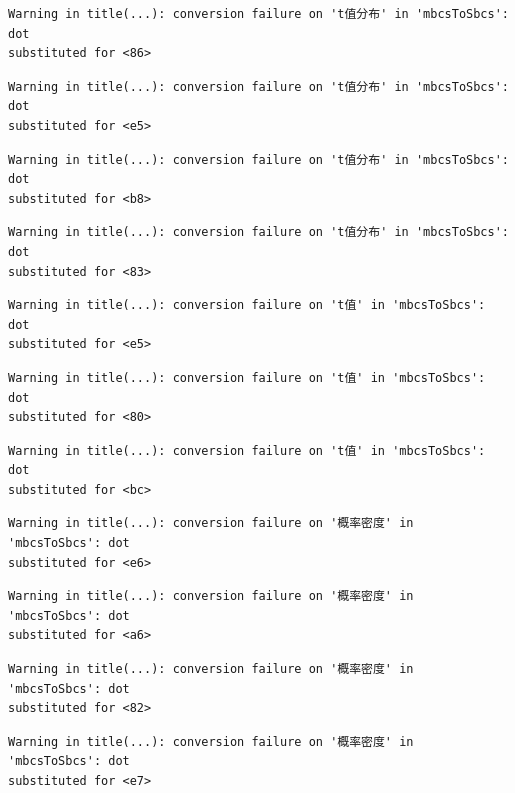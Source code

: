 \documentclass[
  letterpaper,
  DIV=11,
  numbers=noendperiod]{scrreprt}
\begin{document}
\begin{verbatim}
Warning in title(...): conversion failure on 't值分布' in 'mbcsToSbcs': dot
substituted for <86>
\end{verbatim}

\begin{verbatim}
Warning in title(...): conversion failure on 't值分布' in 'mbcsToSbcs': dot
substituted for <e5>
\end{verbatim}

\begin{verbatim}
Warning in title(...): conversion failure on 't值分布' in 'mbcsToSbcs': dot
substituted for <b8>
\end{verbatim}

\begin{verbatim}
Warning in title(...): conversion failure on 't值分布' in 'mbcsToSbcs': dot
substituted for <83>
\end{verbatim}

\begin{verbatim}
Warning in title(...): conversion failure on 't值' in 'mbcsToSbcs': dot
substituted for <e5>
\end{verbatim}

\begin{verbatim}
Warning in title(...): conversion failure on 't值' in 'mbcsToSbcs': dot
substituted for <80>
\end{verbatim}

\begin{verbatim}
Warning in title(...): conversion failure on 't值' in 'mbcsToSbcs': dot
substituted for <bc>
\end{verbatim}

\begin{verbatim}
Warning in title(...): conversion failure on '概率密度' in 'mbcsToSbcs': dot
substituted for <e6>
\end{verbatim}

\begin{verbatim}
Warning in title(...): conversion failure on '概率密度' in 'mbcsToSbcs': dot
substituted for <a6>
\end{verbatim}

\begin{verbatim}
Warning in title(...): conversion failure on '概率密度' in 'mbcsToSbcs': dot
substituted for <82>
\end{verbatim}

\begin{verbatim}
Warning in title(...): conversion failure on '概率密度' in 'mbcsToSbcs': dot
substituted for <e7>
\end{verbatim}
\end{document}
